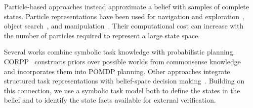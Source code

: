 Particle-based approaches instead approximate a belief with samples of complete states. 
Particle representations have been used for navigation and exploration~\citep{lauri2016exploration,kim2021plgrim}, object search~\citep{xiao2019objectsearch}, and manipulation~\citep{pajarinen2017multiobject,pajarinen2022composition}. Their computational cost can increase with the number of particles required to represent a large state space.  



Several works combine symbolic task knowledge with probabilistic planning.  CORPP~\citep{zhang2015corpp} constructs priors over possible worlds from commonsense knowledge and incorporates them into POMDP planning. Other approaches integrate structured task representations with belief-space decision making~\citep{sanner2010symbolic,serrano2021knowledge,li2026uncertainty}. Building on this connection, we use a symbolic task model both to define the states in the belief and to identify the state facts available for external verification.


